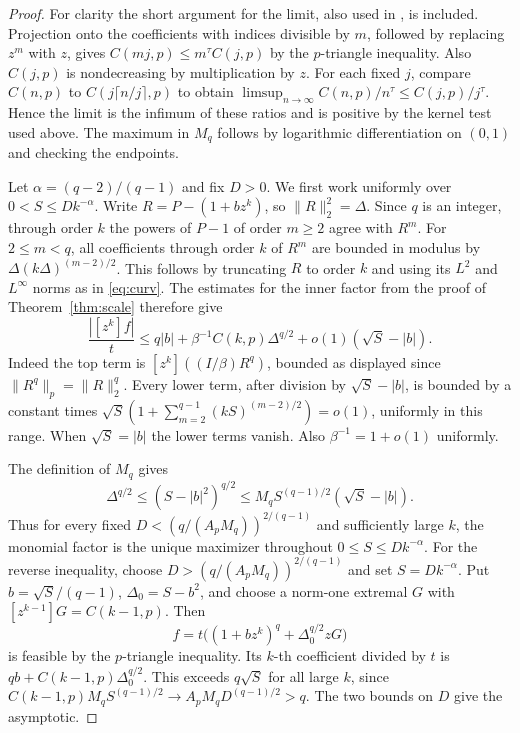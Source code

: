 \documentclass[11pt]{article}
\numberwithin{equation}{section}
\theoremstyle{remark}
\newcommand{\norm}[1]{\lVert #1\rVert}
\newcommand{\coef}[1]{[z^{#1}]}
\begin{document}
\begin{proof}
For clarity the short argument for the limit, also used in
\cite{CorpusLimits}, is included. Projection onto the coefficients
with indices divisible by \(m\), followed by replacing \(z^m\) with
\(z\), gives \(C(mj,p)\le m^\tau C(j,p)\) by the \(p\)-triangle
inequality. Also \(C(j,p)\) is nondecreasing by multiplication by
\(z\). For each fixed \(j\), compare \(C(n,p)\) to
\(C(j\lceil n/j\rceil,p)\) to obtain
\(\limsup_{n\to\infty} C(n,p)/n^\tau\le C(j,p)/j^\tau\).
Hence the limit is the infimum of these ratios and is positive
by the kernel test used above. The maximum in \(M_q\) follows by
logarithmic differentiation on \((0,1)\) and checking the endpoints.

Let \(\alpha=(q-2)/(q-1)\) and fix \(D>0\). We first work uniformly
over \(0<S\le D k^{-\alpha}\).
Write \(R=P-(1+b z^k)\), so \(\norm{R}_2^2=\Delta\).
Since \(q\) is an integer, through order \(k\) the powers of
\(P-1\) of order \(m\ge2\) agree with \(R^m\).
For \(2\le m<q\), all coefficients through order \(k\) of \(R^m\)
are bounded in modulus by \(\Delta(k\Delta)^{(m-2)/2}\).
This follows by truncating \(R\) to order \(k\) and using its
\(L^2\) and \(L^\infty\) norms as in \eqref{eq:curv}.
The estimates for the inner factor from the proof of
Theorem~\ref{thm:scale} therefore give
\[
 \frac{|\coef{k}f|}{t}
 \le q|b|+\beta^{-1} C(k,p)\Delta^{q/2}
       +o(1)(\sqrt S-|b|).
\]
Indeed the top term is \(\coef{k}((I/\beta)R^q)\), bounded as
displayed since \(\norm{R^q}_p=\norm{R}_2^q\). Every lower term,
after division by \(\sqrt S-|b|\), is bounded by a constant times
\(\sqrt S(1+\sum_{m=2}^{q-1}(kS)^{(m-2)/2})=o(1)\),
uniformly in this range. When \(\sqrt S=|b|\) the lower terms
vanish. Also \(\beta^{-1}=1+o(1)\) uniformly.

The definition of \(M_q\) gives
\[
  \Delta^{q/2}
   \le(S-|b|^2)^{q/2}
   \le M_q S^{(q-1)/2}(\sqrt S-|b|).
\]
Thus for every fixed \(D<(q/(A_p M_q))^{2/(q-1)}\) and sufficiently
large \(k\), the monomial factor is the unique maximizer
throughout \(0\le S\le D k^{-\alpha}\).
For the reverse inequality, choose
\(D>(q/(A_p M_q))^{2/(q-1)}\) and set \(S=D k^{-\alpha}\).
Put \(b=\sqrt S/(q-1)\), \(\Delta_0=S-b^2\), and choose a norm-one
extremal \(G\) with \(\coef{k-1}G=C(k-1,p)\).
Then
\[
    f=t\bigl((1+bz^k)^q+\Delta_0^{q/2} zG\bigr)
\]
is feasible by the \(p\)-triangle inequality.
Its \(k\)-th coefficient divided by \(t\) is
\(qb+C(k-1,p)\Delta_0^{q/2}\). This exceeds \(q\sqrt S\)
for all large \(k\), since
\(C(k-1,p) M_q S^{(q-1)/2}\to A_p M_q D^{(q-1)/2}>q\).
The two bounds on \(D\) give the asymptotic.
\end{proof}
\end{document}
